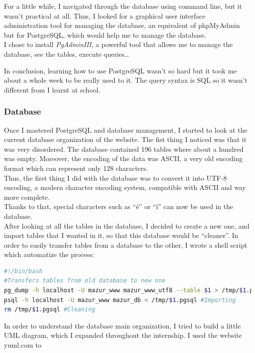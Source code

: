 \documentclass[10pt,a4paper]{article}
\begin{document}
For a little while, I navigated through the database using command line, but it wasn't practical at all. Thus, I looked for a graphical user interface administration tool for managing the database, an equivalent of phpMyAdmin but for PostgreSQL, which would help me to manage the database.\\
I chose to install \textit{PgAdminIII}, a powerful tool that allows me to manage the database, see the tables, execute queries\ldots

In conclusion, learning how to use PostgreSQL wasn't so hard but it took me about a whole week to be really used to it. The query syntax is SQL so it wasn't different from I learnt at school.

\subsubsection*{Database}
Once I mastered PostgreSQL and database management, I started to look at the current database organization of the website. The fist thing I noticed was that it was very disordered. The database contained 196 tables where about a hundred was empty. Moreover, the encoding of the data was ASCII, a very old encoding format which can represent only 128 characters.\\
Thus, the first thing I did with the database was to convert it into UTF-8 encoding, a modern character encoding system, compatible with ASCII and way more complete.\\ Thanks to that, special characters such as ``é'' or ``ï'' can now be used in the database.\\

After looking at all the tables in the database, I decided to create a new one, and import tables that I wanted in it, so that this database would be ``cleaner''. In order to easily transfer tables from a database to the other, I wrote a shell script which automatize the process:\\

\begin{lstlisting}[language=bash]
#!/bin/bash
#Transfers tables from old database to new one
pg_dump -h localhost -U mazur_www mazur_www_utf8 --table $1 > /tmp/$1.pgsql #Exporting
psql -h localhost -U mazur_www mazur_db < /tmp/$1.pgsql #Importing
rm /tmp/$1.pgsql #Cleaning
\end{lstlisting}

In order to understand the database main organization, I tried to build a little UML diagram, which I expanded throughout the internship. I used the website yuml.com%
to
\end{document}
